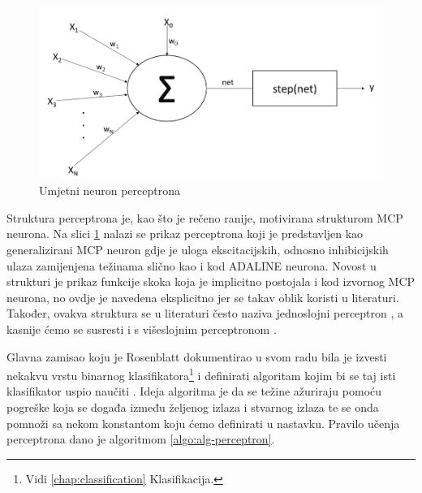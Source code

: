 \documentclass[times, utf8, zavrsni]{fer}
\begin{document}
\begin{figure}[H]
    \centering
    \includegraphics[scale=0.5]{img/step-neuron.png}
    \caption[Caption for LOF]{Umjetni neuron perceptrona\footnotemark}
    \label{fig:step-neuron}
\end{figure}

Struktura perceptrona je, kao što je rečeno ranije, motivirana strukturom MCP neurona. Na slici \ref{fig:step-neuron} nalazi se prikaz perceptrona koji je predstavljen kao generalizirani MCP neuron gdje je uloga ekscitacijskih, odnosno inhibicijskih ulaza zamijenjena težinama slično kao i kod ADALINE neurona. Novost u strukturi je prikaz funkcije skoka  koja je implicitno postojala i kod izvornog MCP neurona, no ovdje je navedena eksplicitno jer se takav oblik koristi u literaturi. Također, ovakva struktura se u literaturi često naziva jednoslojni perceptron , a kasnije ćemo se susresti i s višeslojnim perceptronom .

Glavna zamisao koju je Rosenblatt dokumentirao u svom radu bila je izvesti nekakvu vrstu binarnog klasifikatora\footnote{Vidi \ref{chap:classification} Klasifikacija.} i definirati algoritam kojim bi se taj isti klasifikator uspio naučiti \citep{rosenblatt}. Ideja algoritma je da se težine ažuriraju pomoću pogreške koja se događa između željenog izlaza i stvarnog izlaza te se onda pomnoži sa nekom konstantom koju ćemo definirati u nastavku. Pravilo učenja perceptrona dano je algoritmom \ref{algo:alg-perceptron}.
\end{document}
